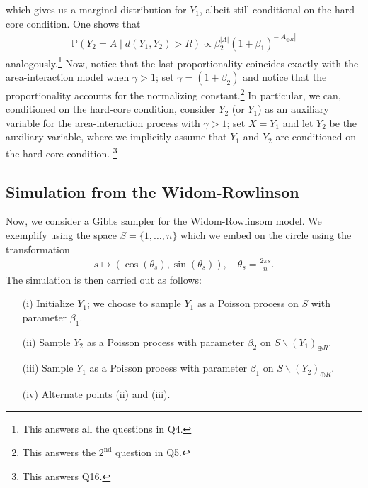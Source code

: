 \documentclass{article}
\begin{document}
which gives us a marginal distribution for $Y_1$, albeit still conditional on the hard-core condition. One shows that
\begin{align*}
    \mathbb{P}(Y_2 = A \mid d(Y_1,Y_2)>R) \propto\beta_2^{|A|} (1+\beta_1)^{-|A_{\oplus R}|}
\end{align*}
analogously.\footnote{This answers all the questions in Q4.}
Now, notice that the last proportionality coincides exactly with the area-interaction model when $\gamma > 1$; set $\gamma = (1 + \beta_2)$ and notice that the proportionality accounts for the normalizing constant.\footnote{This answers the $2^{\mathrm{nd}}$ question in Q5.}\newline\newline
In particular, we can, conditioned on the hard-core condition, consider $Y_2$ (or $Y_1$) as an auxiliary variable for the area-interaction process with $\gamma > 1$; set $X = Y_1$ and let $Y_2$ be the auxiliary variable, where we implicitly assume that $Y_1$ and $Y_2$ are conditioned on the hard-core condition. \footnote{This answers Q16.}
\subsection{Simulation from the Widom-Rowlinson}
Now, we consider a Gibbs sampler for the Widom-Rowlinsom model. We exemplify using the space $S = \{1,\dots, n\}$ which we embed on the circle using the transformation 
\begin{align*}
    s \mapsto (\cos(\theta_s), \sin(\theta_s)), \quad \theta_s = \frac{2\pi s}{n}.
\end{align*}
The simulation is then carried out as follows: 
\begin{itemize}
    \item[(i)] Initialize $Y_1$; we choose to sample $Y_1$ as a Poisson process on $S$ with parameter $\beta_1$.
    \item[(ii)] Sample $Y_2$ as a Poisson process with parameter $\beta_2$ on $S\backslash (Y_{1})_{\oplus R}$. 
    \item[(iii)] Sample $Y_1$ as a Poisson process with parameter $\beta_1$ on $S\backslash (Y_{2})_{\oplus R}$.
    \item[(iv)] Alternate points (ii) and (iii).  
\end{itemize}
\end{document}
